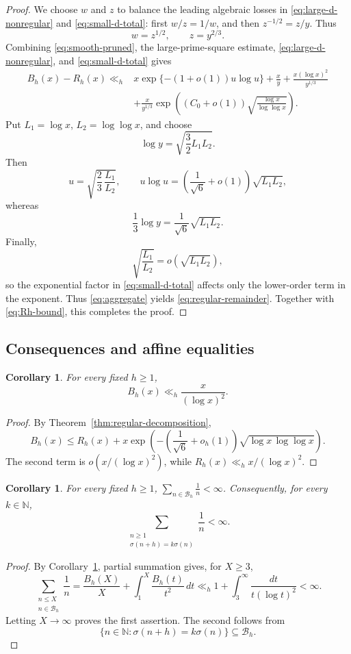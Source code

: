 \documentclass[11pt,reqno]{amsart}
\numberwithin{equation}{section}
\theoremstyle{plain}
\newtheorem{corollary}[theorem]{Corollary}
\theoremstyle{definition}
\theoremstyle{remark}
\newcommand{\N}{\mathbb N}
\begin{document}
\begin{proof}
We choose $w$ and $z$ to balance the leading algebraic losses in
\eqref{eq:large-d-nonregular} and \eqref{eq:small-d-total}: first
$w/z=1/w$, and then $z^{-1/2}=z/y$. Thus
\[
w=z^{1/2},\qquad z=y^{2/3}.
\]
Combining \eqref{eq:smooth-pruned}, the large-prime-square estimate, \eqref{eq:large-d-nonregular}, and \eqref{eq:small-d-total} gives
\begin{equation}\label{eq:aggregate}
\begin{aligned}
B_h(x)-R_h(x)
\ll_h{}&
x\exp\{-(1+o(1))u\log u\}
+\frac xy
+\frac{x(\log x)^2}{y^{1/3}}\\
&+\frac{x}{y^{1/3}}
\exp\!\left((C_0+o(1))\sqrt{\frac{\log x}{\log\log x}}\right).
\end{aligned}
\end{equation}
Put $L_1=\log x$, $L_2=\log\log x$, and choose
\[
\log y=\sqrt{\frac32L_1L_2}.
\]
Then
\[
u=\sqrt{\frac23\,\frac{L_1}{L_2}},
\qquad
u\log u=
\left(\frac1{\sqrt6}+o(1)\right)\sqrt{L_1L_2},
\]
whereas
\[
\frac13\log y=\frac1{\sqrt6}\sqrt{L_1L_2}.
\]
Finally,
\[
\sqrt{\frac{L_1}{L_2}}=o(\sqrt{L_1L_2}),
\]
so the exponential factor in \eqref{eq:small-d-total} affects only the lower-order term in the exponent. Thus \eqref{eq:aggregate} yields \eqref{eq:regular-remainder}. Together with \eqref{eq:Rh-bound}, this completes the proof.
\end{proof}

\subsection{Consequences and affine equalities}

\begin{corollary}\label{cor:divisibility-bound}
For every fixed $h\ge1$,
\[
B_h(x)\ll_h\frac{x}{(\log x)^2}.
\]
\end{corollary}
\begin{proof}
By Theorem~\ref{thm:regular-decomposition},
\[
B_h(x)
\le
R_h(x)
+
x\exp\!\left(
-\left(\frac1{\sqrt6}+o_h(1)\right)
\sqrt{\log x\,\log\log x}
\right).
\]
The second term is $o(x/(\log x)^2)$, while $R_h(x)\ll_hx/(\log x)^2$.
\end{proof}

\begin{corollary}\label{cor:reciprocal-sum}
For every fixed $h\ge1$, $\sum_{n\in\mathcal B_h}\frac1n<\infty$.
Consequently, for every $k\in\N$,
\[
\sum_{\substack{n\ge1\\ \sigma(n+h)=k\sigma(n)}}\frac1n<\infty.
\]
\end{corollary}
\begin{proof}
By Corollary~\ref{cor:divisibility-bound}, partial summation gives, for $X\ge3$,
\[
\sum_{\substack{n\le X\\ n\in\mathcal B_h}}\frac1n
=
\frac{B_h(X)}{X}
+
\int_1^X\frac{B_h(t)}{t^2}\,dt
\ll_h
1+\int_3^\infty\frac{dt}{t(\log t)^2}
<\infty.
\]
Letting $X\to\infty$ proves the first assertion. The second follows from
\[
\{n\in\N:\sigma(n+h)=k\sigma(n)\}\subseteq\mathcal B_h.
\]
\end{proof}
\end{document}
